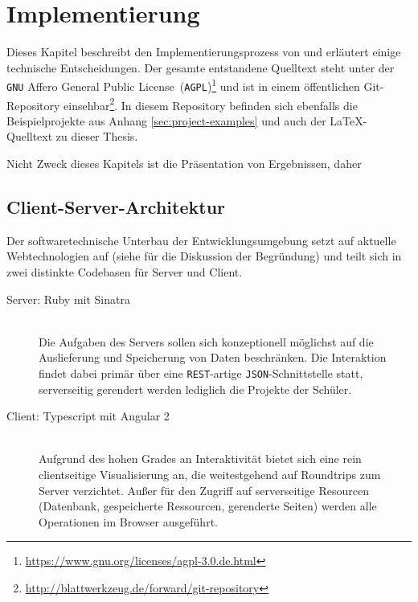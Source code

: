 \section{Implementierung}
\label{sec:implementation-analysis}

Dieses Kapitel beschreibt den Implementierungsprozess von \idename{} und erläutert einige technische Entscheidungen. Der gesamte entstandene Quelltext steht unter der \texttt{GNU} Affero General Public License~(\texttt{AGPL})\footnote{\url{https://www.gnu.org/licenses/agpl-3.0.de.html}} und ist in einem öffentlichen Git-Repository einsehbar\footnote{\url{http://blattwerkzeug.de/forward/git-repository}}. In diesem Repository befinden sich ebenfalls die Beispielprojekte aus Anhang \ref{sec:project-examples} und auch der \LaTeX-Quelltext zu dieser Thesis.

Nicht Zweck dieses Kapitels ist die Präsentation von Ergebnissen, daher

\subsection{Client-Server-Architektur}
\label{sec:implementation-client-server}

Der softwaretechnische Unterbau der Entwicklungsumgebung setzt auf aktuelle Webtechnologien auf (siehe  für die Diskussion der Begründung) und teilt sich in zwei distinkte Codebasen für Server und Client.

\begin{description}
\item[Server: Ruby mit Sinatra] \hfill\\
  Die Aufgaben des Servers sollen sich konzeptionell möglichst auf die Auslieferung und Speicherung von Daten beschränken. Die Interaktion findet dabei primär über eine \texttt{REST}-artige \texttt{JSON}-Schnittstelle statt, serverseitig gerendert werden lediglich die Projekte der Schüler.
\item[Client: Typescript mit Angular 2] \hfill\\
  Aufgrund des hohen Grades an Interaktivität bietet sich eine rein clientseitige Visualisierung an, die weitestgehend auf Roundtrips zum Server verzichtet. Außer für den Zugriff auf serverseitige Resourcen (Datenbank, gespeicherte Ressourcen, gerenderte Seiten) werden alle Operationen im Browser ausgeführt.
\end{description}


